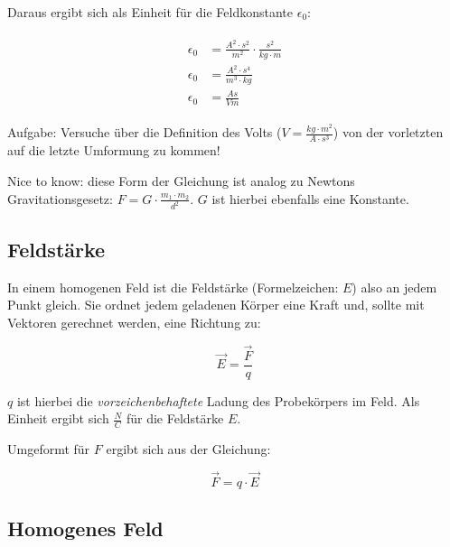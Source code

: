 Daraus ergibt sich als Einheit für die Feldkonstante $\epsilon_0$:

\begin{align}\label{eq:feldkonstante_einheiten}
\begin{split}
	\epsilon_0 &= \frac{A^{2} \cdot s^{2}}{m^{2}} \cdot \frac{s^{2}}{kg \cdot m} \\
	\epsilon_0 &= \frac{A^{2} \cdot s^{4}}{m^{3} \cdot kg} \\
	\epsilon_0 &= \frac{As}{Vm}
\end{split}
\end{align}

\begin{leftbar}
Aufgabe: Versuche über die Definition des Volts ($V=\frac{kg \cdot m^2}{A \cdot s^3}$) von der vorletzten auf die letzte Umformung zu kommen!
\end{leftbar}

\begin{leftbar}
Nice to know: diese Form der Gleichung ist analog zu Newtons Gravitationsgesetz: $F = G \cdot \frac{m_1 \cdot m_2}{d^2}$. $G$ ist hierbei ebenfalls eine Konstante.
\end{leftbar}



\subsection{Feldstärke} 

In einem homogenen Feld ist die Feldstärke (Formelzeichen: $E$) also an jedem Punkt gleich. Sie ordnet jedem geladenen Körper eine Kraft und, sollte mit Vektoren gerechnet werden, eine Richtung zu:

\begin{equation} \label{eq:feldstaerke}
	\vec{E} = \frac{\vec{F}}{q}
\end{equation}

$q$ ist hierbei die \emph{vorzeichenbehaftete} Ladung des Probekörpers im Feld. Als Einheit ergibt sich $\frac{N}{C}$ für die Feldstärke $E$. 

Umgeformt für $F$ ergibt sich aus der Gleichung:

\begin{equation} \label{eq:feldstaerke_nach_F}
	\vec{F} = q \cdot \vec{E}
\end{equation}


\subsection{Homogenes Feld} \label{subsec:EFeldHomogen}

